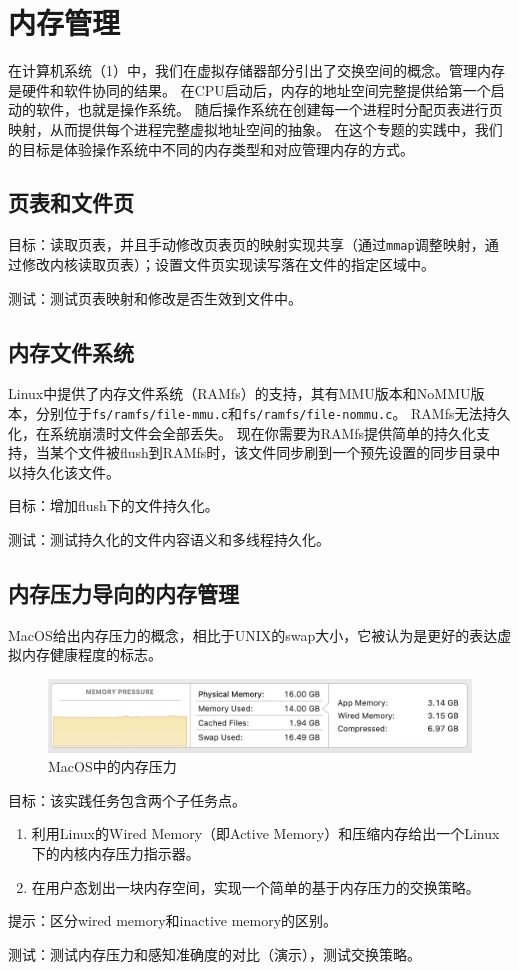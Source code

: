\chapter{内存管理}
在计算机系统（1）中，我们在虚拟存储器部分引出了交换空间的概念。管理内存是硬件和软件协同的结果。
在CPU启动后，内存的地址空间完整提供给第一个启动的软件，也就是操作系统。
随后操作系统在创建每一个进程时分配页表进行页映射，从而提供每个进程完整虚拟地址空间的抽象。
在这个专题的实践中，我们的目标是体验操作系统中不同的内存类型和对应管理内存的方式。

\section{页表和文件页}
目标：读取页表，并且手动修改页表页的映射实现共享（通过\texttt{mmap}调整映射，通过修改内核读取页表）；设置文件页实现读写落在文件的指定区域中。

测试：测试页表映射和修改是否生效到文件中。

\section{内存文件系统}
Linux中提供了内存文件系统（RAMfs）的支持，其有MMU版本和NoMMU版本，分别位于\texttt{fs/ramfs/file-mmu.c}和\texttt{fs/ramfs/file-nommu.c}。
RAMfs无法持久化，在系统崩溃时文件会全部丢失。
现在你需要为RAMfs提供简单的持久化支持，当某个文件被flush到RAMfs时，该文件同步刷到一个预先设置的同步目录中以持久化该文件。

目标：增加flush下的文件持久化。

测试：测试持久化的文件内容语义和多线程持久化。



\section{内存压力导向的内存管理}
MacOS给出内存压力的概念，相比于UNIX的swap大小，它被认为是更好的表达虚拟内存健康程度的标志。

\begin{figure}[h]
    \centering
    \includegraphics[width=0.8\linewidth]{figure/mixed-figures/memory-pressure.png}
    \caption{MacOS中的内存压力}
    \label{fig:enter-label}
\end{figure}

目标：该实践任务包含两个子任务点。
\begin{enumerate}
    \item 利用Linux的Wired Memory（即Active Memory）和压缩内存给出一个Linux下的内核内存压力指示器。
    \item 在用户态划出一块内存空间，实现一个简单的基于内存压力的交换策略。
\end{enumerate}


提示：区分wired memory和inactive memory的区别。

测试：测试内存压力和感知准确度的对比（演示），测试交换策略。
